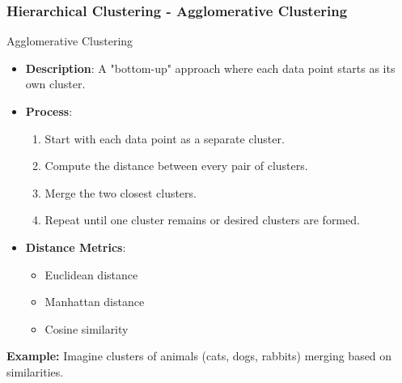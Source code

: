\documentclass[aspectratio=169]{beamer}
\begin{document}
\begin{frame}[fragile]
    \frametitle{Hierarchical Clustering - Agglomerative Clustering}
    \begin{block}{Agglomerative Clustering}
        \begin{itemize}
            \item \textbf{Description}: A "bottom-up" approach where each data point starts as its own cluster.
            \item \textbf{Process}:
            \begin{enumerate}
                \item Start with each data point as a separate cluster.
                \item Compute the distance between every pair of clusters.
                \item Merge the two closest clusters.
                \item Repeat until one cluster remains or desired clusters are formed.
            \end{enumerate}
            \item \textbf{Distance Metrics}:
            \begin{itemize}
                \item Euclidean distance
                \item Manhattan distance
                \item Cosine similarity
            \end{itemize}
        \end{itemize}
    \end{block}
    \begin{example}
        \textbf{Example:} Imagine clusters of animals (cats, dogs, rabbits) merging based on similarities.
    \end{example}
\end{frame}
\end{document}
